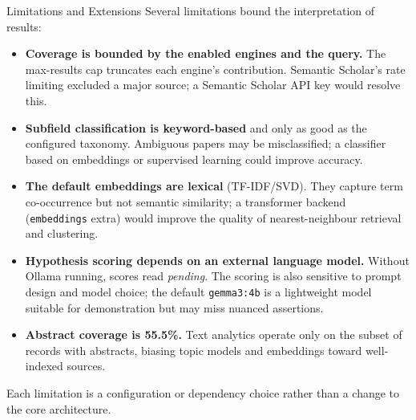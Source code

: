 \documentclass[
  ignorenonframetext,
]{beamer}
\begin{document}
\begin{frame}{Limitations and Extensions}
\protect{}\label{limitations-and-extensions}
Several limitations bound the interpretation of results:

\begin{itemize}
\item
  \textbf{Coverage is bounded by the enabled engines and the query.} The
  max-results cap truncates each engine's contribution. Semantic
  Scholar's rate limiting excluded a major source; a Semantic Scholar
  API key would resolve this.
\item
  \textbf{Subfield classification is keyword-based} and only as good as
  the configured taxonomy. Ambiguous papers may be misclassified; a
  classifier based on embeddings or supervised learning could improve
  accuracy.
\item
  \textbf{The default embeddings are lexical} (TF-IDF/SVD). They capture
  term co-occurrence but not semantic similarity; a transformer backend
  (\texttt{embeddings} extra) would improve the quality of
  nearest-neighbour retrieval and clustering.
\item
  \textbf{Hypothesis scoring depends on an external language model.}
  Without Ollama running, scores read \emph{pending}. The scoring is
  also sensitive to prompt design and model choice; the default
  \texttt{gemma3:4b} is a lightweight model suitable for demonstration
  but may miss nuanced assertions.
\item
  \textbf{Abstract coverage is 55.5\%.} Text analytics operate only on
  the subset of records with abstracts, biasing topic models and
  embeddings toward well-indexed sources.
\end{itemize}

Each limitation is a configuration or dependency choice rather than a
change to the core architecture.
\end{frame}
\end{document}
